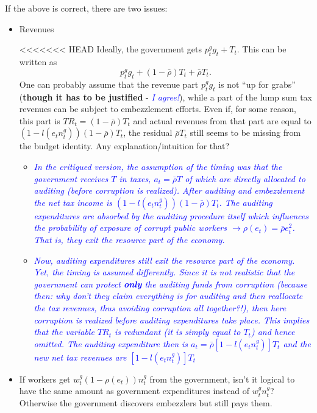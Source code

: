 \documentclass[]{scrartcl}
\begin{document}
\begin{enumerate}
If the above is correct, there are two issues:
\begin{itemize}
\item Revenues

<<<<<<< HEAD
Ideally, the government gets $ p^g_t g_t + T_t $. This can be written as \[  p^g_t g_t + (1-\bar{\rho}) T_t + \bar{\rho} T_t. \] One can probably assume that the revenue part $p^g_t g_t$ is not ``up for grabs'' (\textbf{though it has to be justified} - \textit{\textcolor{blue}{I agree!}}), while a part of the lump sum tax revenues can be subject to embezzlement efforts. Even if, for some reason, this part is $ TR_t = (1-\bar{\rho}) T_t $ and actual revenues from that part are equal to $ (1-l(e_t n_t^g))(1-\bar{\rho}) T_t $, the residual $ \bar{\rho} T_t $ still seems to be missing from the budget identity. Any explanation/intuition for that?
\begin{itemize}
\item \textit{\textcolor{blue}{In the critiqued version, the assumption of the timing was that the government receives $ T $ in taxes, $ a_t=\bar{\rho}T $ of which are directly allocated to auditing (before corruption is realized). After auditing and embezzlement the net tax income is $ (1-l(e_t n_t^g))(1-\bar{\rho}) T_t $. The auditing expenditures are absorbed by the auditing procedure itself which influences the probability of exposure of corrupt public workers $ \rightarrow \rho(e_t)=\bar{\rho}e_t^2$. That is, they exit the resource part of the economy.}}
\item \textcolor{blue}{\textit{Now, auditing expenditures still exit the resource part of the economy. Yet, the timing is assumed differently. Since it is not realistic that the government can protect \textbf{only} the auditing funds from corruption (because then: why don't they claim everything is for auditing and then reallocate the tax revenues, thus avoiding corruption all together?!), then here corruption is realized before auditing expenditures take place. This implies that the variable $ TR_t $ is redundant (it is simply equal to $ T_t $) and hence omitted. The auditing expenditure then is $ a_t= \bar{\rho}\left[ 1-l\left( e_tn_t^g \right) \right]T_t $ and the new net tax revenues are $ \left[ 1-l\left( e_tn_t^g \right) \right]T_t $}}
\end{itemize}
\item If workers get $ w^g_t (1-\rho(e_t))n^g_t $ from the government, isn't it logical to have the same amount as government expenditures instead of $ w_t^g n_t^g $? Otherwise the government discovers embezzlers but still pays them.

\end{itemize}
\end{enumerate}
\end{document}
